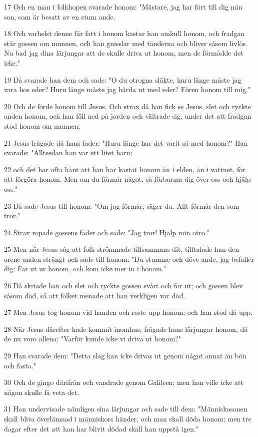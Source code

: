 \par 17 Och en man i folkhopen svarade honom: "Mästare, jag har fört till dig min son, som är besatt av en stum ande.
\par 18 Och varhelst denne får fatt i honom kastar han omkull honom, och fradgan står gossen om munnen, och han gnisslar med tänderna och bliver såsom livlös. Nu bad jag dina lärjungar att de skulle driva ut honom, men de förmådde det icke."
\par 19 Då svarade han dem och sade: "O du otrogna släkte, huru länge måste jag vara hos eder? Huru länge måste jag härda ut med eder? Fören honom till mig."
\par 20 Och de förde honom till Jesus. Och strax då han fick se Jesus, slet och ryckte anden honom, och han föll ned på jorden och vältrade sig, under det att fradgan stod honom om munnen.
\par 21 Jesus frågade då hans fader: "Huru länge har det varit så med honom?" Han svarade: "Alltsedan han var ett litet barn;
\par 22 och det har ofta hänt att han har kastat honom än i elden, än i vattnet, för att förgöra honom. Men om du förmår något, så förbarma dig över oss och hjälp oss."
\par 23 Då sade Jesus till honom: "Om jag förmår, säger du. Allt förmår den som tror."
\par 24 Strax ropade gossens fader och sade: "Jag tror! Hjälp min otro."
\par 25 Men när Jesus såg att folk strömmade tillsammans dit, tilltalade han den orene anden strängt och sade till honom: "Du stumme och döve ande, jag befaller dig: Far ut ur honom, och kom icke mer in i honom."
\par 26 Då skriade han och slet och ryckte gossen svårt och for ut; och gossen blev såsom död, så att folket menade att han verkligen var död.
\par 27 Men Jesus tog honom vid handen och reste upp honom; och han stod då upp.
\par 28 När Jesus därefter hade kommit inomhus, frågade hans lärjungar honom, då de nu voro allena: "Varför kunde icke vi driva ut honom?"
\par 29 Han svarade dem: "Detta slag kan icke drivas ut genom något annat än bön och fasta."
\par 30 Och de gingo därifrån och vandrade genom Galileen; men han ville icke att någon skulle få veta det.
\par 31 Han undervisade nämligen sina lärjungar och sade till dem: "Människosonen skall bliva överlämnad i människors händer, och man skall döda honom; men tre dagar efter det att han har blivit dödad skall han uppstå igen."
